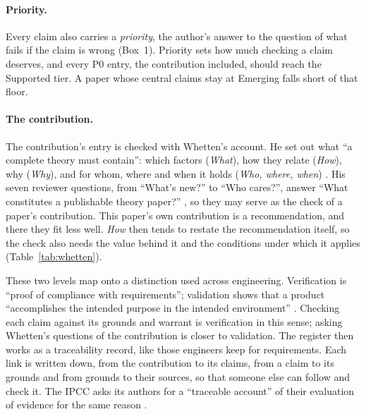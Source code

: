 \documentclass[12pt, a4paper]{article}
\begin{document}
\paragraph{Priority.}
Every claim also carries a \emph{priority}, the author's answer to the
question of what fails if the claim is wrong (Box~1).  Priority sets how much checking a claim deserves, and every P0 entry,
the contribution included, should reach the Supported tier.  A paper whose central claims stay at
Emerging falls short of that floor.

\paragraph{The contribution.}
The contribution's entry is checked with Whetten's account.  He set out what ``a
complete theory must contain'': which factors (\emph{What}), how they
relate (\emph{How}), why (\emph{Why}), and for whom, where and when it
holds (\emph{Who, where, when}) \citep[pp.~490--492]{whetten1989}.
His seven reviewer questions, from ``What's new?'' to ``Who cares?'',
answer ``What constitutes a publishable theory paper?''
\citep[p.~494]{whetten1989}, so they may serve as the check of a paper's contribution.  This
paper's own contribution is a recommendation, and there they fit less
well.  \emph{How} then tends to restate the recommendation itself, so
the check also needs the value behind it and the conditions under which
it applies (Table~\ref{tab:whetten}).

These two levels map onto a distinction used across engineering.
Verification is ``proof of compliance with requirements''; validation
shows that a product ``accomplishes the intended purpose in the intended
environment'' \citep[\S2.0]{nasa2016}.  Checking each claim against its
grounds and warrant is verification in this sense; asking Whetten's
questions of the contribution is closer to validation.  The register then works as a traceability record, like those engineers keep for requirements.  Each link is
written down, from the contribution to its claims, from a claim to its
grounds and from grounds to their sources, so that someone else can
follow and check it.  The IPCC asks its authors for a ``traceable account'' of
their evaluation of evidence for the same reason \citep{mastrandrea2010}.

\end{document}
